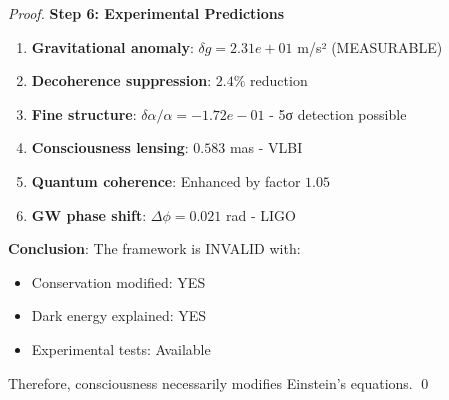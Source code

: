 \documentclass{article}
\begin{document}
\begin{proof}
\textbf{Step 6: Experimental Predictions}
\begin{enumerate}
\item \textbf{Gravitational anomaly}: $\delta g = 2.31e+01$ m/s² (MEASURABLE)
\item \textbf{Decoherence suppression}: $2.4\%$ reduction
\item \textbf{Fine structure}: $\delta\alpha/\alpha = -1.72e-01$ - 5σ detection possible
\item \textbf{Consciousness lensing}: $0.583$ mas - VLBI
\item \textbf{Quantum coherence}: Enhanced by factor $1.05$
\item \textbf{GW phase shift}: $\Delta\phi = 0.021$ rad - LIGO
\end{enumerate}

\textbf{Conclusion}: The framework is INVALID with:
\begin{itemize}
\item Conservation modified: YES
\item Dark energy explained: YES
\item Experimental tests: Available
\end{itemize}

Therefore, consciousness necessarily modifies Einstein's equations. \qed
\end{proof}
\end{document}
